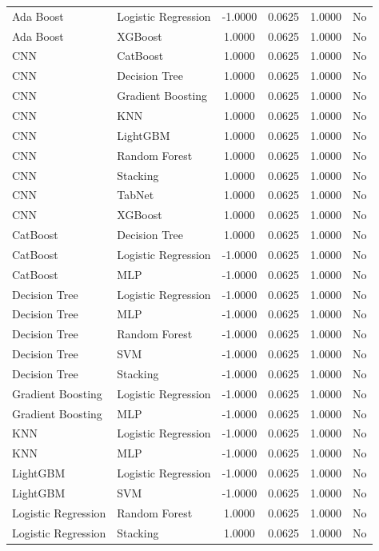 \documentclass[a4paper,fleqn]{cas-sc}
\begin{document}
\begin{longtable}{l l c c c c}
Ada Boost & Logistic Regression & -1.0000 & 0.0625 & 1.0000 & No \\
Ada Boost & XGBoost & 1.0000 & 0.0625 & 1.0000 & No \\
CNN & CatBoost & 1.0000 & 0.0625 & 1.0000 & No \\
CNN & Decision Tree & 1.0000 & 0.0625 & 1.0000 & No \\
CNN & Gradient Boosting & 1.0000 & 0.0625 & 1.0000 & No \\
CNN & KNN & 1.0000 & 0.0625 & 1.0000 & No \\
CNN & LightGBM & 1.0000 & 0.0625 & 1.0000 & No \\
CNN & Random Forest & 1.0000 & 0.0625 & 1.0000 & No \\
CNN & Stacking & 1.0000 & 0.0625 & 1.0000 & No \\
CNN & TabNet & 1.0000 & 0.0625 & 1.0000 & No \\
CNN & XGBoost & 1.0000 & 0.0625 & 1.0000 & No \\
CatBoost & Decision Tree & 1.0000 & 0.0625 & 1.0000 & No \\
CatBoost & Logistic Regression & -1.0000 & 0.0625 & 1.0000 & No \\
CatBoost & MLP & -1.0000 & 0.0625 & 1.0000 & No \\
Decision Tree & Logistic Regression & -1.0000 & 0.0625 & 1.0000 & No \\
Decision Tree & MLP & -1.0000 & 0.0625 & 1.0000 & No \\
Decision Tree & Random Forest & -1.0000 & 0.0625 & 1.0000 & No \\
Decision Tree & SVM & -1.0000 & 0.0625 & 1.0000 & No \\
Decision Tree & Stacking & -1.0000 & 0.0625 & 1.0000 & No \\
Gradient Boosting & Logistic Regression & -1.0000 & 0.0625 & 1.0000 & No \\
Gradient Boosting & MLP & -1.0000 & 0.0625 & 1.0000 & No \\
KNN & Logistic Regression & -1.0000 & 0.0625 & 1.0000 & No \\
KNN & MLP & -1.0000 & 0.0625 & 1.0000 & No \\
LightGBM & Logistic Regression & -1.0000 & 0.0625 & 1.0000 & No \\
LightGBM & SVM & -1.0000 & 0.0625 & 1.0000 & No \\
Logistic Regression & Random Forest & 1.0000 & 0.0625 & 1.0000 & No \\
Logistic Regression & Stacking & 1.0000 & 0.0625 & 1.0000 & No \\

\end{longtable}
\end{document}
